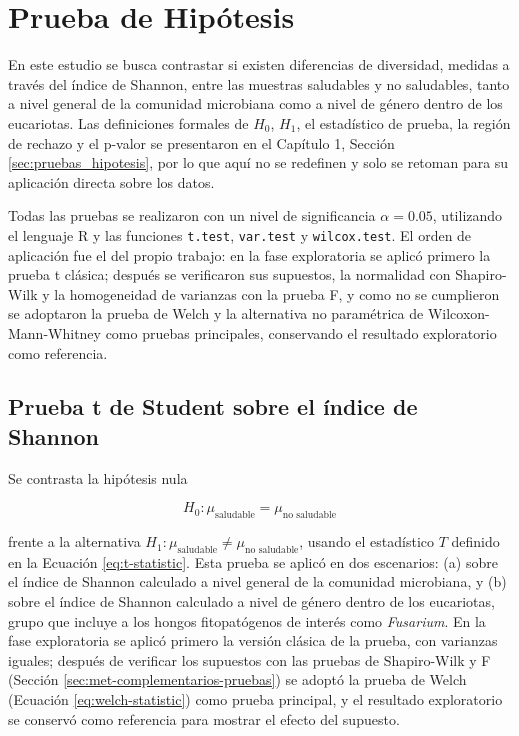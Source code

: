 \section{Prueba de Hipótesis}

En este estudio se busca contrastar si existen diferencias de diversidad, medidas a través del índice
de Shannon, entre las muestras saludables y no saludables, tanto a nivel general de la comunidad
microbiana como a nivel de género dentro de los eucariotas. Las definiciones formales de $H_0$, $H_1$, el
estadístico de prueba, la región de rechazo y el p-valor se presentaron en el Capítulo 1,
Sección \ref{sec:pruebas_hipotesis}, por lo que aquí no se redefinen y solo se retoman para su
aplicación directa sobre los datos.

Todas las pruebas se realizaron con un nivel de significancia $\alpha = 0.05$, utilizando el lenguaje
R \citep{rcoreteam2023r} y las funciones \texttt{t.test}, \texttt{var.test} y \texttt{wilcox.test}. El orden de
aplicación fue el del propio trabajo: en la fase exploratoria se aplicó primero la prueba t clásica;
después se verificaron sus supuestos, la normalidad con Shapiro-Wilk y la homogeneidad de varianzas
con la prueba F, y como no se cumplieron se adoptaron la prueba de Welch y la alternativa no
paramétrica de Wilcoxon-Mann-Whitney como pruebas principales, conservando el resultado exploratorio
como referencia.

\subsection{Prueba t de Student sobre el índice de Shannon}

Se contrasta la hipótesis nula

\begin{equation}
H_0: \mu_{\text{saludable}} = \mu_{\text{no saludable}}
\label{eq:hip-shannon}
\end{equation}

frente a la alternativa $H_1: \mu_{\text{saludable}} \neq \mu_{\text{no saludable}}$, usando el
estadístico $T$ definido en la Ecuación \ref{eq:t-statistic}. Esta prueba se aplicó en dos escenarios:
(a) sobre el índice de Shannon calculado a nivel general de la comunidad microbiana, y (b) sobre el
índice de Shannon calculado a nivel de género dentro de los eucariotas, grupo que incluye a los
hongos fitopatógenos de interés como \textit{Fusarium}. En la fase exploratoria se aplicó primero la
versión clásica de la prueba, con varianzas iguales; después de verificar los supuestos con las
pruebas de Shapiro-Wilk y F (Sección \ref{sec:met-complementarios-pruebas}) se adoptó la prueba de
Welch (Ecuación \ref{eq:welch-statistic}) como prueba principal, y el resultado exploratorio se
conservó como referencia para mostrar el efecto del supuesto.

